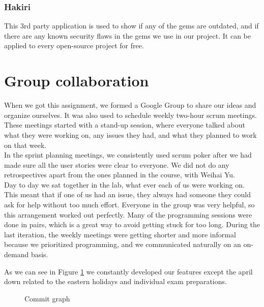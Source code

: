 \documentclass[a4paper]{article}
\begin{document}
\subsubsection{Hakiri}
This 3rd party application is used to show if any of the gems are outdated, and if there are any known security flaws in the gems we use in our project. It can be applied to every open-source project for free.

\section{Group collaboration}
When we got this assignment, we formed a Google Group to share our ideas and organize ourselves. It was also used to schedule weekly two-hour scrum meetings. These meetings started with a stand-up session, where everyone talked about what they were working on, any issues they had, and what they planned to work on that week.\\

\noindent
In the sprint planning meetings, we consistently used scrum poker after we had made sure all the user stories were clear to everyone. We did not do any retrospectives apart from the ones planned in the course, with Weihai Yu.\\

\noindent
Day to day we sat together in the lab, what ever each of us were working on. This meant that if one of us had an issue, they always had someone they could ask for help without too much effort. Everyone in the group was very helpful, so this arrangement worked out perfectly. Many of the programming sessions were done in pairs, which is a great way to avoid getting stuck for too long. During the last iteration, the weekly meetings were getting shorter and more informal because we prioritized programming, and we communicated naturally on an on-demand basis.


\noindent
As we can see in Figure \ref{fig:commitgraph} we constantly developed our features except the april down related to the eastern holidays and individual exam preparations.\\

\begin{figure}[!h]
  \begin{center}
    \caption{Commit graph}
    \label{fig:commitgraph}
  \end{center}
\end{figure}
\end{document}
